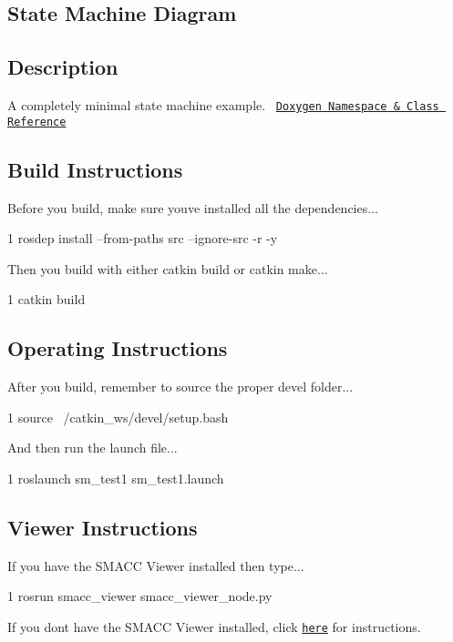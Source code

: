 \subsection*{State Machine Diagram}



\subsection*{Description}

A completely minimal state machine example.~\newline
 \href{https://reelrbtx.github.io/SMACC_Documentation/master/html/namespacesm__atomic.html}{\tt Doxygen Namespace \& Class Reference}

\subsection*{Build Instructions}

Before you build, make sure you\textquotesingle{}ve installed all the dependencies...


\begin{DoxyCode}
1 rosdep install --from-paths src --ignore-src -r -y 
\end{DoxyCode}


Then you build with either catkin build or catkin make...


\begin{DoxyCode}
1 catkin build
\end{DoxyCode}
 \subsection*{Operating Instructions}

After you build, remember to source the proper devel folder...


\begin{DoxyCode}
1 source ~/catkin\_ws/devel/setup.bash
\end{DoxyCode}


And then run the launch file...


\begin{DoxyCode}
1 roslaunch sm\_test1 sm\_test1.launch
\end{DoxyCode}


\subsection*{Viewer Instructions}

If you have the S\+M\+A\+CC Viewer installed then type...


\begin{DoxyCode}
1 rosrun smacc\_viewer smacc\_viewer\_node.py
\end{DoxyCode}


If you don\textquotesingle{}t have the S\+M\+A\+CC Viewer installed, click \href{http://smacc.ninja/smacc-viewer/}{\tt here} for instructions. 